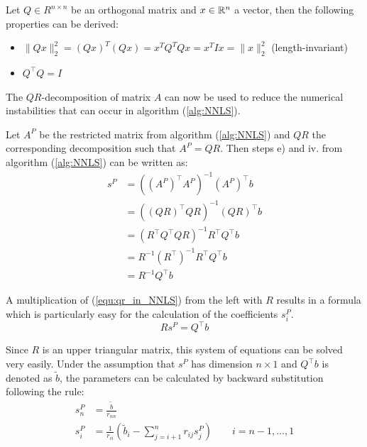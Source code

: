 \begin{remark} Let $Q \in R^{n \times n}$ be an orthogonal matrix and $x \in \mathbb{R}^n$ a vector, then the following properties can be derived:
	\begin{itemize}
		\item $\lVert Qx \rVert_2^2 = (Qx)^T (Qx) = x^T Q^T Q x = x^T I x = \lVert x \rVert_2^2$ \hfill (length-invariant)
		\item $Q^\top Q = I$
	\end{itemize}
\end{remark}

The $QR$-decomposition of matrix $A$ can now be used to reduce the numerical instabilities that can occur in algorithm (\ref{alg:NNLS}). 

\begin{remark}\label{rem:qr_in_NNLS} 
	Let $A^P$ be the restricted matrix from algorithm (\ref{alg:NNLS}) and $QR$ the corresponding decomposition such that $A^P = QR$. Then steps e) and iv. from algorithm (\ref{alg:NNLS}) can be written as:
	\begin{equation}\label{equ:qr_in_NNLS}
		\begin{aligned}
			 s^P 	&= ((A^P)^\top A^P)^{-1} (A^P)^\top b \\
			 		&= ((QR)^\top QR)^{-1} (QR)^\top b \\
			 		&= (R^\top Q^\top Q R)^{-1} R^\top Q^\top b \\
			 		&= R^{-1} (R^\top)^{-1} R^\top Q^\top b \\
			 		&= R^{-1} Q^\top b
		\end{aligned}
	\end{equation}
\end{remark}

A multiplication of (\ref{equ:qr_in_NNLS}) from the left with $R$ results in a formula which is particularly easy for the calculation of the coefficients $s^P_i$.
\begin{equation}\label{equ:qr_in_NNLS_opt}
	R s^P = Q^\top b
\end{equation}

Since $R$ is an upper triangular matrix, this system of equations can be solved very easily. Under the assumption that $s^P$ has dimension $n \times 1$ and $Q^\top b$ is denoted as $\tilde{b}$, the parameters can be calculated by backward substitution following the rule:
\begin{align*}
	s^P_n 	&= \frac{\tilde{b}}{r_{nn}} \\
	s^P_i	&= \frac{1}{r_{ii}} \left( \tilde{b}_i - \sum_{j = i + 1}^{n} r_{ij} s^P_j\right) \quad \quad i = n-1, ..., 1
\end{align*}

